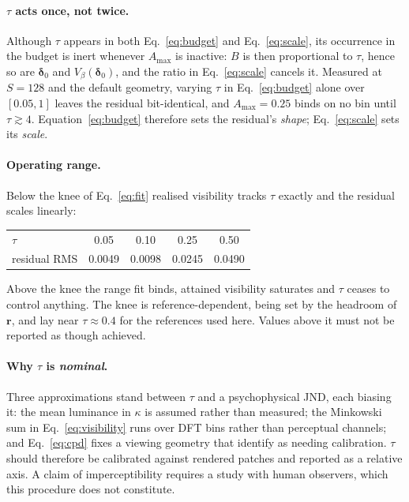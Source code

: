 \documentclass[11pt,a4paper]{article}
\begin{document}
\paragraph{$\tau$ acts once, not twice.}
Although $\tau$ appears in both Eq.~\eqref{eq:budget} and
Eq.~\eqref{eq:scale}, its occurrence in the budget is inert whenever
$A_{\max}$ is inactive: $B$ is then proportional to $\tau$, hence so are
$\boldsymbol{\delta}_0$ and $V_\beta(\boldsymbol{\delta}_0)$, and the
ratio in Eq.~\eqref{eq:scale} cancels it. Measured at $S=128$ and the
default geometry, varying $\tau$ in Eq.~\eqref{eq:budget} alone over
$[0.05,1]$ leaves the residual bit-identical, and $A_{\max}=0.25$ binds
on no bin until $\tau\gtrsim4$. Equation~\eqref{eq:budget} therefore
sets the residual's \emph{shape}; Eq.~\eqref{eq:scale} sets its
\emph{scale}.

\paragraph{Operating range.}
Below the knee of Eq.~\eqref{eq:fit} realised visibility tracks $\tau$
exactly and the residual scales linearly:

\begin{center}
\begin{tabular}{@{}lcccc@{}}
\toprule
$\tau$ & 0.05 & 0.10 & 0.25 & 0.50 \\
residual RMS & 0.0049 & 0.0098 & 0.0245 & 0.0490 \\
\bottomrule
\end{tabular}
\end{center}

\noindent
Above the knee the range fit binds, attained visibility saturates and
$\tau$ ceases to control anything. The knee is reference-dependent,
being set by the headroom of $\mathbf{r}$, and lay near $\tau\approx0.4$
for the references used here. Values above it must not be reported as
though achieved.

\paragraph{Why $\tau$ is \emph{nominal}.}
Three approximations stand between $\tau$ and a psychophysical JND, each
biasing it: the mean luminance in $\kappa$ is assumed rather than
measured; the Minkowski sum in Eq.~\eqref{eq:visibility} runs over DFT
bins rather than perceptual channels; and Eq.~\eqref{eq:cpd} fixes a
viewing geometry that \citet[Sec.~6]{galinska2026csflow} identify as
needing calibration. $\tau$ should therefore be calibrated against
rendered patches and reported as a relative axis. A claim of
imperceptibility requires a study with human observers, which this
procedure does not constitute.
\end{document}
